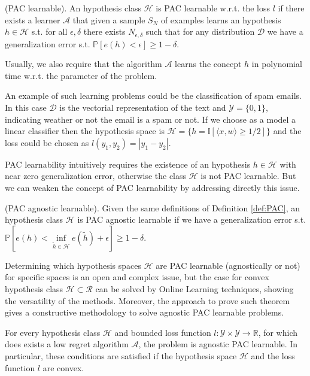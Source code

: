 \begin{definition}(PAC learnable).\label{def:PAC}
    An hypothesis class $\mathcal H$ is PAC learnable w.r.t. the loss $l$ if there exists a learner $\mathcal A$ that given a sample $S_N$ of examples learns an hypothesis $h\in\mathcal H$ s.t. for all $\epsilon,\delta$ there exists $N_{\epsilon,\delta}$ such that for any distribution $\mathcal D$ we have a generalization error s.t. $\mathbb P\left[e(h)<\epsilon\right]\ge1-\delta$.
\end{definition}

Usually, we also require that the algorithm $\mathcal A$ learns the concept $h$ in polynomial time w.r.t. the parameter of the problem. 

An example of such learning problems could be the classification of spam emails. In this case $\mathcal D$ is the vectorial representation of the text and $\mathcal Y=\{0,1\}$, indicating weather or not the email is a spam or not. If we choose as a model a linear classifier then the hypothesis space is $\mathcal H=\{h = \mathbb I[\langle x,w\rangle \ge 1/2]\}$ and the loss could be chosen as $l(y_1,y_2)=|y_1-y_2|$.

PAC learnability intuitively requires the existence of an hypothesis $h\in\mathcal H$ with near zero generalization error, otherwise the class $\mathcal H$ is not PAC learnable.
But we can weaken the concept of PAC learnability by addressing directly this issue.

\begin{definition}(PAC agnostic learnable).
    Given the same definitions of Definition \ref{def:PAC}, an hypothesis class $\mathcal H$ is PAC agnostic learnable if we have a generalization error s.t. $\mathbb P\left[e(h)<\inf\limits_{\tilde h\in\mathcal H}e(\tilde h)+\epsilon\right]\ge1-\delta.$
\end{definition}

Determining which hypothesis spaces $\mathcal H$ are PAC learnable (agnostically or not) for specific spaces is an open and complex issue, but the case for convex hypothesis class $\mathcal H\subset\mathcal R$ can be solved by Online Learning techniques, showing the versatility of the methods. 
Moreover, the approach to prove such theorem gives a constructive methodology to solve agnostic PAC learnable problems.

\begin{theorem}
For every hypothesis class $\mathcal H$ and bounded loss function $l:\mathcal Y\times\mathcal Y\to \mathbb R$, for which does exists a low regret algorithm $\mathcal A$, the problem is agnostic PAC learnable. In particular, these conditions are satisfied if the hypothesis space $\mathcal H$ and the loss function $l$ are convex.
\end{theorem}

